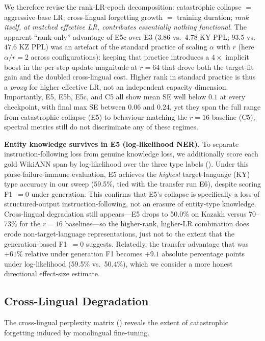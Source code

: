 \documentclass[11pt]{article}
\begin{document}
We therefore revise the rank-LR-epoch decomposition: catastrophic collapse $=$ aggressive base LR; cross-lingual forgetting growth $=$ training duration; \emph{rank itself, at matched effective LR, contributes essentially nothing functional}. The apparent ``rank-only'' advantage of E5c over E3 ($3.86$ vs.\ $4.78$ KY PPL; $93.5$ vs.\ $47.6$ KZ PPL) was an artefact of the standard practice of scaling $\alpha$ with $r$ (here $\alpha/r=2$ across configurations): keeping that practice introduces a $4\times$ implicit boost in the per-step update magnitude at $r{=}64$ that drove both the target-fit gain and the doubled cross-lingual cost. Higher rank in standard practice is thus a \emph{proxy} for higher effective LR, not an independent capacity dimension. Importantly, E5, E5b, E5c, and C5 all show mean SE well below $0.1$ at every checkpoint, with final max SE between $0.06$ and $0.24$, yet they span the full range from catastrophic collapse (E5) to behaviour matching the $r{=}16$ baseline (C5); spectral metrics still do not discriminate any of these regimes.

\textbf{Entity knowledge survives in E5 (log-likelihood NER).} To separate instruction-following loss from genuine knowledge loss, we additionally score each gold WikiANN span by log-likelihood over the three type labels (). Under this parse-failure-immune evaluation, E5 achieves the \emph{highest} target-language (KY) type accuracy in our sweep (59.5\%, tied with the transfer run E6), despite scoring F1~$= 0$ under generation. This confirms that E5's collapse is specifically a loss of structured-output instruction-following, not an erasure of entity-type knowledge. Cross-lingual degradation still appears---E5 drops to 50.0\% on Kazakh versus 70--73\% for the $r{=}16$ baselines---so the higher-rank, higher-LR combination does erode non-target-language representations, just not to the extent that the generation-based F1~$= 0$ suggests. Relatedly, the transfer advantage that was $+61\%$ relative under generation F1 becomes $+9.1$ absolute percentage points under log-likelihood (59.5\% vs.\ 50.4\%), which we consider a more honest directional effect-size estimate.

\subsection{Cross-Lingual Degradation}
\label{sec:crosslingual}

The cross-lingual perplexity matrix () reveals the extent of catastrophic forgetting induced by monolingual fine-tuning.
\end{document}
